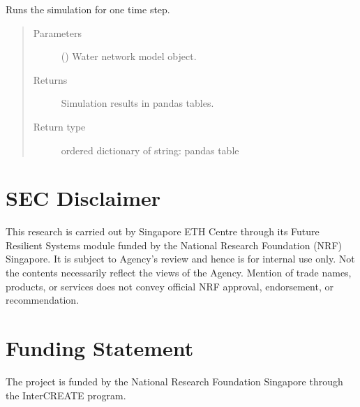\documentclass[letterpaper,10pt,english]{sphinxmanual}
\begin{document}
\begin{fulllineitems}
\label{\detokenize{apidoc:dreaminsg_integrated_model.src.network_sim_models.water.water_network_model.run_water_simulation}}
\sphinxAtStartPar
Runs the simulation for one time step.
\begin{quote}\begin{description}
\item[{Parameters}] \leavevmode
\sphinxAtStartPar
{} () \textendash{} Water network model object.

\item[{Returns}] \leavevmode
\sphinxAtStartPar
Simulation results in pandas tables.

\item[{Return type}] \leavevmode
\sphinxAtStartPar
ordered dictionary of string: pandas table

\end{description}\end{quote}

\end{fulllineitems}



\chapter{SEC Disclaimer}
\label{\detokenize{index:sec-disclaimer}}
\sphinxAtStartPar
This research is carried out by Singapore ETH Centre through its Future Resilient Systems module
funded by the National Research Foundation (NRF) Singapore. It is subject to Agency’s review and hence is for internal use only.
Not the contents necessarily reflect the views of the Agency. Mention of trade names, products, or services does not convey official
NRF approval, endorsement, or recommendation.


\chapter{Funding Statement}
\label{\detokenize{index:funding-statement}}
\sphinxAtStartPar
The project is funded by the National Research Foundation Singapore through the Inter\sphinxhyphen{}CREATE program.
\end{document}
